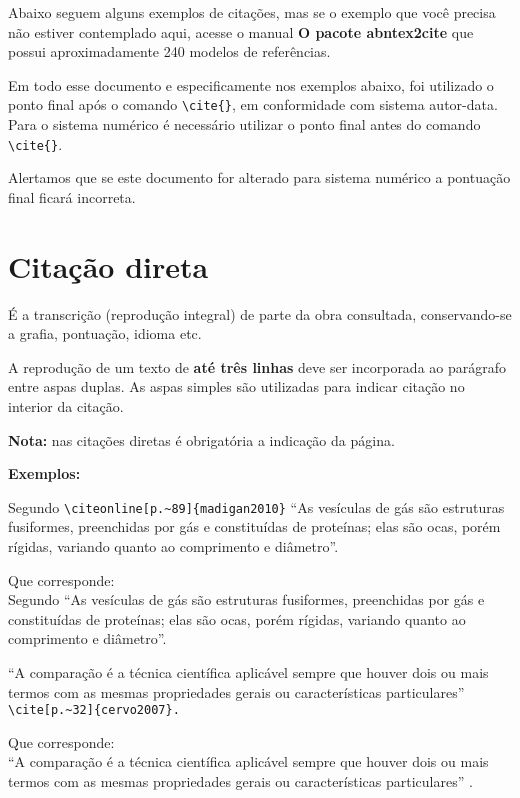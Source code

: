 Abaixo seguem alguns exemplos de citações, mas se o exemplo que voc\^e precisa não estiver contemplado aqui, acesse o manual \textbf{O pacote abntex2cite} que possui aproximadamente 240 modelos de refer\^encias.

Em todo esse documento e especificamente nos exemplos abaixo, foi utilizado o ponto final após o comando \verb+\cite{}+, em conformidade com sistema autor-data. Para o sistema num\'erico \'e necess\'ario utilizar o ponto final antes do comando \verb+\cite{}+. 

Alertamos que se este documento for alterado para sistema num\'erico a pontuação final ficar\'a incorreta. 

\section{Citação direta}

É a transcrição (reprodução integral) de parte da obra consultada, conservando-se a grafia, pontuação, idioma etc.

A reprodução de um texto de \textbf{at\'e tr\^es linhas} deve ser incorporada ao par\'agrafo entre aspas duplas. As aspas simples são utilizadas para indicar citação no interior da citação.

\textbf{Nota:} nas citações diretas \'e obrigatória a indicação da p\'agina.

\textbf{Exemplos: }

\begin{alineas} 
\item 

Segundo \verb+\citeonline[p.~89]{madigan2010}+ “As vesículas de g\'as são estruturas fusiformes, preenchidas por g\'as e constituídas de proteínas; elas são ocas, por\'em rígidas, variando quanto ao comprimento e di\^ametro”.

Que corresponde: \\
Segundo  “As vesículas de g\'as são estruturas
fusiformes, preenchidas por g\'as e constituídas de proteínas; elas são ocas, por\'em
rígidas, variando quanto ao comprimento e di\^ametro”.

\item 

“A comparação \'e a t\'ecnica científica aplic\'avel sempre que houver dois ou
mais termos com as mesmas propriedades gerais ou características particulares”  \verb+\cite[p.~32]{cervo2007}.+

Que corresponde: \\
“A comparação \'e a t\'ecnica científica aplic\'avel sempre que houver dois ou
mais termos com as mesmas propriedades gerais ou características particulares” \cite[p.~32]{cervo2007}.

\end{alineas}

